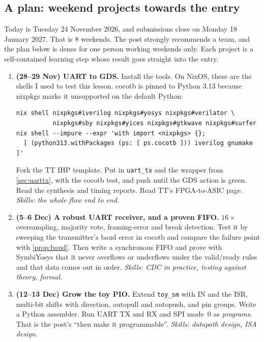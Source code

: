 \subsection{A plan: weekend projects towards the entry}\label{sec:plan}

Today is Tuesday 24 November 2026, and submissions close on Monday
18 January 2027. That is 8 weekends. The post strongly recommends a team, and
the plan below is dense for one person working weekends only. Each project
is a self-contained learning step whose result goes straight into the
entry.

\begin{enumerate}[label=\textbf{P\arabic*}]
  \item \textbf{(28--29 Nov) UART to GDS.} Install the tools. On NixOS, these
    are the shells I used to test this lesson. cocotb is pinned to Python
    3.13 because nixpkgs marks it unsupported on the default Python:
\begin{verbatim}
nix shell nixpkgs#iverilog nixpkgs#yosys nixpkgs#verilator \
          nixpkgs#sby nixpkgs#yices nixpkgs#gtkwave nixpkgs#surfer
nix shell --impure --expr 'with import <nixpkgs> {};
  [ (python313.withPackages (ps: [ ps.cocotb ])) iverilog gnumake ]'
\end{verbatim}
    Fork the TT IHP template. Put in \texttt{uart\_tx} and
    the wrapper from \cref{sec:uarttx}, with the cocotb test, and push until
    the GDS action is green. Read the synthesis and timing reports. Read TT's
    FPGA-to-ASIC page. \emph{Skills: the whole flow end to end.}
  \item \textbf{(5--6 Dec) A robust UART receiver, and a proven FIFO.}
    $16\times$ oversampling, majority vote, framing-error and break
    detection. Test it by sweeping the transmitter's baud error in cocotb
    and compare the failure point with \cref{prop:baud}. Then write a
    synchronous FIFO and prove with SymbiYosys that it never overflows or
    underflows under the valid/ready rules and that data comes out in
    order. \emph{Skills: CDC in practice, testing against theory, formal.}
  \item \textbf{(12--13 Dec) Grow the toy PIO.} Extend \texttt{toy\_sm}
    with IN and the ISR, multi-bit shifts with direction, autopull and
    autopush, and pin groups. Write a Python assembler. Run UART TX and RX
    and SPI mode~0 as \emph{programs}. That is the post's ``then make it
    programmable''. \emph{Skills: datapath design, ISA design.}

\end{enumerate}
